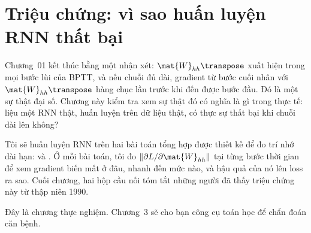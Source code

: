 \chapter{Triệu chứng: vì sao huấn luyện RNN thất bại}
\label{ch:trieu-chung}

Chương~01 kết thúc bằng một nhận xét: $\mat{W}_{hh}\transpose$ xuất hiện trong
mọi bước lùi của BPTT, và nếu chuỗi đủ dài, gradient từ bước cuối nhân với
$\mat{W}_{hh}\transpose$ hàng chục lần trước khi đến được bước đầu. Đó là một
sự thật đại số. Chương này kiểm tra xem sự thật đó có nghĩa là gì trong thực
tế: liệu một RNN thật, huấn luyện trên dữ liệu thật, có thực sự thất bại khi
chuỗi dài lên không?

Tôi sẽ huấn luyện RNN trên hai bài toán tổng hợp được thiết kế để đo trí nhớ
dài hạn:  và . Ở mỗi bài toán, tôi đo $\|\partial L / \partial \mat{W}_{hh}\|$ tại
từng bước thời gian để xem gradient biến mất ở đâu, nhanh đến mức nào, và
hậu quả của nó lên loss ra sao. Cuối chương, hai hộp cầu nối tóm tắt những
người đã thấy triệu chứng này từ thập niên 1990.

Đây là chương thực nghiệm. Chương~3 sẽ cho bạn công cụ toán học để chẩn đoán
căn bệnh.








